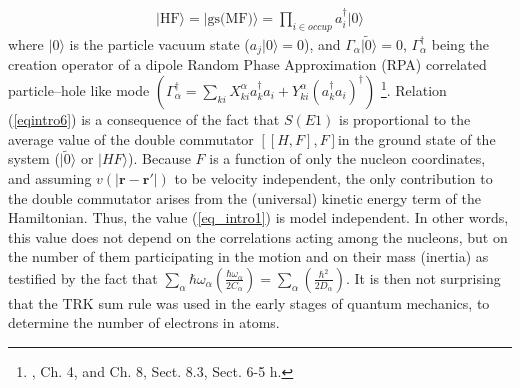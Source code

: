 \begin{align}
|\text{HF}\rangle=|\text{gs(MF)}\rangle=\prod_{i\in occup}a^\dagger_i |0\rangle
\end{align}
where $|0\rangle$ is the particle vacuum state ($a_j|0\rangle=0$), and $\Gamma_\alpha|\tilde 0\rangle=0$, $\Gamma^\dagger_\alpha$ being the creation operator of a dipole Random Phase Approximation (RPA) correlated particle--hole like mode $(\Gamma_\alpha^\dagger=\sum_{ki}X_{ki}^\alpha a_k^\dagger a_i+Y^\alpha_{ki}(a_k^\dagger a_i)^\dagger)$ \footnote{\cite{Bertsch:05}, Ch. 4, and \cite{Brink:05} Ch. 8, Sect. 8.3, \cite{Bohr:75} Sect. 6-5 h.}. Relation (\ref{eqintro6}) is a consequence of the fact that $S(E1)$ is proportional to the average value of the double  commutator $[[H,F],F]$in the ground state of the system ($|\tilde 0\rangle$ or $|HF\rangle$). Because $F$ is a function of only the nucleon coordinates, and assuming $v(|\mathbf{r}-\mathbf{r}'|)$ to be velocity independent, the only contribution to the double commutator arises from the (universal) kinetic energy term of the Hamiltonian. Thus, the value (\ref{eq_intro1}) is model independent. In other words, this value does not depend on the correlations acting among the nucleons, but on the number of them participating in the motion and on their mass (inertia) as testified by the fact that $\sum_{\alpha}\hbar \omega_\alpha\left(\frac{\hbar\omega_\alpha}{2C_\alpha}\right)=\sum_{\alpha}\left(\frac{\hbar^2}{2D_\alpha}\right)$. It is then not surprising that the TRK sum rule was used in the early stages of quantum mechanics, to determine the number of electrons in atoms.


